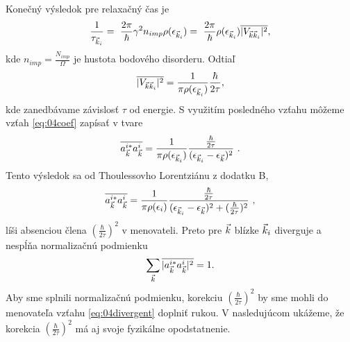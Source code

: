 Konečný výsledok pre relaxačný čas je
\begin{align}
\label{eq:04fgr_final}
\frac{1}{\tau_{\vec{k}_i}}
=\
\frac{2\pi}{\hbar}\gamma^2n_{imp}\rho(\epsilon_{\vec{k}_i})
=\
\frac{2\pi}{\hbar}\rho(\epsilon_{\vec{k}_i})\overline{|V_{\vec{k}\vec{k}_i}|^2}
 \text{,}
\end{align}
kde $n_{imp}=\frac{N_{imp}}{\Omega}$ je hustota bodového disorderu. Odtiaľ
\begin{equation}
\label{maticelement fi}
\overline{|V_{\vec{k}\vec{k}_i}|^2}  = \frac{1}{\pi\rho(\epsilon_{\vec{k}_i})} \frac{\hbar}{2\tau} \text{,}
\end{equation}
kde zanedbávame závislosť $ \tau$ od energie. S využitím posledného vzťahu môžeme vzťah \eqref{eq:04coef} zapísať v tvare
\begin{align}
\label{eq:04divergent}
\overline{a_{\vec{k}}^{i*}a_{\vec{k}}^i}=\frac{1}{\pi\rho(\epsilon_{\vec{k}_i})}
\frac{\frac{\hbar}{2\tau}}{(\epsilon_{\vec{k}_i}-\epsilon_{\vec{k}})^2}
\ \text{.}
\end{align}
Tento výsledok sa od Thoulessovho Lorentziánu z dodatku B,
\begin{align}
\label{eq:04lorenz}
\overline{a_{\vec{k}}^{i*}a_{\vec{k}}^i}=\frac{1}{\pi\rho(\epsilon_i)}
\frac{\frac{\hbar}{2\tau}}
{
(\epsilon_{\vec{k}_i}-\epsilon_{\vec{k}})^2
+ (\frac{\hbar}{2\tau})^2
}
\ \text{,}
\end{align}
líši absenciou člena $(\frac{\hbar}{2\tau})^2$ v menovateli.
Preto pre $\vec{k}$ blízke $\vec{k}_i$  diverguje a nespĺňa normalizačnú podmienku
\begin{align}
\sum_{\vec{k}} \overline{|a_{\vec{k}}^{i*}a_{\vec{k}}^i|^2}=1\text{.}
\end{align}
Aby sme splnili normalizačnú podmienku, korekciu $(\frac{\hbar}{2\tau})^2$ by sme mohli do menovateľa vzťahu \eqref{eq:04divergent} doplniť rukou.
V nasledujúcom ukážeme, že korekcia $(\frac{\hbar}{2\tau})^2$ má aj svoje fyzikálne opodstatnenie.

